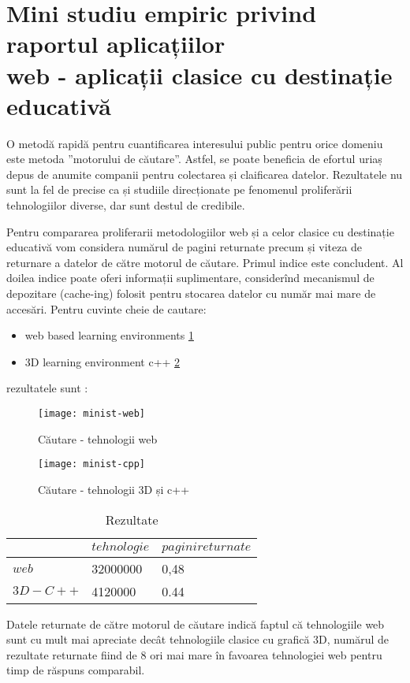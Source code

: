 \section{Mini studiu empiric privind raportul aplicațiilor \\ web - aplicații clasice cu destinație educativă}
\par O metodă rapidă pentru cuantificarea interesului public pentru orice domeniu este metoda ”motorului de căutare”. Astfel, se poate beneficia de efortul uriaș depus de anumite companii pentru colectarea și claificarea datelor. Rezultatele nu sunt la fel de precise ca și studiile direcționate pe fenomenul proliferării tehnologiilor diverse, dar sunt destul de credibile.
\par Pentru compararea proliferarii metodologiilor web și a celor clasice cu destinație educativă vom considera numărul de pagini returnate precum și viteza de returnare a datelor de către motorul de căutare. Primul indice este concludent. Al doilea indice poate oferi informații suplimentare, considerînd mecanismul de depozitare (cache-ing) folosit pentru stocarea datelor cu număr mai mare de accesări. Pentru cuvinte cheie de cautare:
\begin{itemize}
\item web based learning environments \ref{fig:imag1}
\item 3D learning environment c++ \ref{fig:imag2}
\end{itemize}
rezultatele sunt :

\begin{figure}[h, scale=2.0]
    \centering
    \texttt{[image: minist-web]}
    \caption{Căutare - tehnologii web}
    \label{fig:imag1}
\end{figure}

\begin{figure}[h, scale=2.0]
    \centering
    \texttt{[image: minist-cpp]}
    \caption{Căutare - tehnologii 3D și c++}
    \label{fig:imag2}
\end{figure}

\begin{table}
      \begin{center}
            \begin{tabular}{|l|l|l|}
                \hline 
                \cline{2-3}
                & $tehnologie$ & $pagini returnate$  \\ 
        	\hline
                $web$   &  32000000    &  0,48  \\
                $3D-C++$   &  4120000    &  0.44  \\
            \hline
	    \end{tabular}
        \end{center}
    \caption{Rezultate}
    \label{tab:rez}
\end{table}

\par Datele returnate de către motorul de căutare indică faptul că tehnologiile web sunt cu mult mai apreciate decât tehnologiile clasice cu grafică 3D, numărul de rezultate returnate fiind de 8 ori mai mare în favoarea tehnologiei web pentru timp de răspuns comparabil.